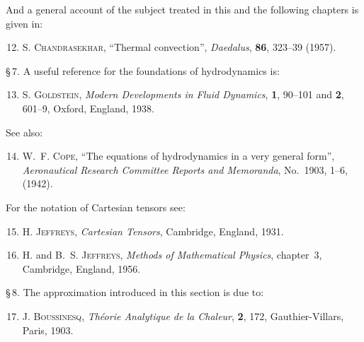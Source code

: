 \noindent And a general account of the subject treated in this and the following chapters
is given in:

\begin{enumerate}
\setcounter{enumi}{11}

\item S. \textsc{Chandrasekhar}, ``Thermal convection'', \textit{Daedalus},
  \textbf{86}, 323--39 (1957).

\end{enumerate}

\noindent \S\,7. A useful reference for the foundations of hydrodynamics is:

\begin{enumerate}
\setcounter{enumi}{12}

\item S. \textsc{Goldstein}, \textit{Modern Developments in Fluid Dynamics},
  \textbf{1}, 90--101 and \textbf{2}, 601--9, Oxford, England, 1938.

\end{enumerate}

\noindent See also:

\begin{enumerate}
\setcounter{enumi}{13}

\item W.~F. \textsc{Cope}, ``The equations of hydrodynamics in a very general form'',
  \textit{Aeronautical Research Committee Reports and Memoranda}, No.~1903, 1--6,
  (1942).

\end{enumerate}

\noindent For the notation of Cartesian tensors see:

\begin{enumerate}
\setcounter{enumi}{14}

\item H. \textsc{Jeffreys}, \textit{Cartesian Tensors}, Cambridge, England, 1931.

\item H. and B.~S. \textsc{Jeffreys}, \textit{Methods of Mathematical Physics},
  chapter~3, Cambridge, England, 1956.

\end{enumerate}

\noindent \S\,8. The approximation introduced in this section is due to:

\begin{enumerate}
\setcounter{enumi}{16}

\item J. \textsc{Boussinesq}, \textit{Th\'eorie Analytique de la Chaleur}, \textbf{2},
  172, Gauthier-Villars, Paris, 1903.

\end{enumerate}

